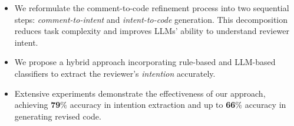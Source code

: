 \begin{itemize}[leftmargin=*,topsep=2pt]
    \item We reformulate the comment-to-code refinement process into two sequential steps: \textit{comment-to-intent} and \textit{intent-to-code} generation. This decomposition reduces task complexity and improves LLMs' ability to understand reviewer intent.
    \item We propose a hybrid approach incorporating rule-based and LLM-based classifiers to extract the reviewer's \textit{intention} accurately.
    \item Extensive experiments demonstrate the effectiveness of our approach, achieving \textbf{79}\% accuracy in intention extraction and up to \textbf{66}\% accuracy in generating revised code.
\end{itemize}











